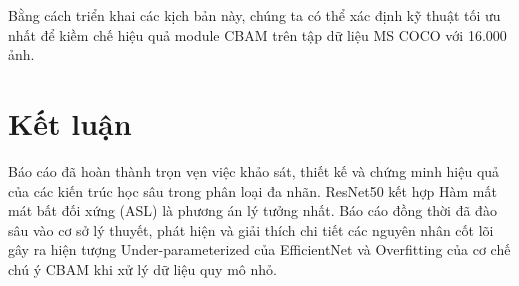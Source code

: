\documentclass{article}
\begin{document}
Bằng cách triển khai các kịch bản này, chúng ta có thể xác định kỹ thuật tối ưu nhất để kiềm chế hiệu quả module CBAM trên tập dữ liệu MS COCO với 16.000 ảnh.

\section{Kết luận}
Báo cáo đã hoàn thành trọn vẹn việc khảo sát, thiết kế và chứng minh hiệu quả của các kiến trúc học sâu trong phân loại đa nhãn. ResNet50 kết hợp Hàm mất mát bất đối xứng (ASL) là phương án lý tưởng nhất. Báo cáo đồng thời đã đào sâu vào cơ sở lý thuyết, phát hiện và giải thích chi tiết các nguyên nhân cốt lõi gây ra hiện tượng Under-parameterized của EfficientNet và Overfitting của cơ chế chú ý CBAM khi xử lý dữ liệu quy mô nhỏ.
\end{document}
